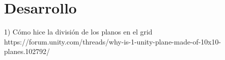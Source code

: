 
\chapter{Desarrollo}
\label{desarrollo}

1) Cómo hice la división de los planos en el grid
https://forum.unity.com/threads/why-is-1-unity-plane-made-of-10x10-planes.102792/